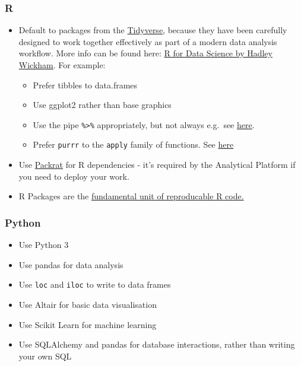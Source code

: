\documentclass[]{book}
\providecommand{\tightlist}{%
  \setlength{\itemsep}{0pt}\setlength{\parskip}{0pt}}
\begin{document}
\hypertarget{r-1}{%
\subsubsection*{R}\label{r-1}}

\begin{itemize}
\tightlist
\item
  Default to packages from the \href{http://tidyverse.org/}{Tidyverse}, because they have been carefully designed to work together effectively as part of a modern data analysis workflow. More info can be found here: \href{http://r4ds.had.co.nz}{R for Data Science by Hadley Wickham}. For example:

  \begin{itemize}
  \tightlist
  \item
    Prefer tibbles to data.frames
  \item
    Use ggplot2 rather than base graphics
  \item
    Use the pipe \texttt{\%\textgreater{}\%} appropriately, but not always e.g.~see \href{https://twitter.com/hadleywickham/status/603883121197514752}{here}.\\
  \item
    Prefer \texttt{purrr} to the \texttt{apply} family of functions. See \href{http://r4ds.had.co.nz/iteration.html\#the-map-functions}{here}
  \end{itemize}
\item
  Use \href{https://rstudio.github.io/packrat/}{Packrat} for R dependencies - it's required by the Analytical Platform if you need to deploy your work.
\item
  R Packages are the \href{http://r-pkgs.had.co.nz/}{fundamental unit of reproducable R code.}
\end{itemize}

\hypertarget{python-1}{%
\subsubsection*{Python}\label{python-1}}

\begin{itemize}
\tightlist
\item
  Use Python 3
\item
  Use pandas for data analysis
\item
  Use \texttt{loc} and \texttt{iloc} to write to data frames
\item
  Use Altair for basic data visualisation
\item
  Use Scikit Learn for machine learning
\item
  Use SQLAlchemy and pandas for database interactions, rather than writing your own SQL
\end{itemize}
\end{document}
